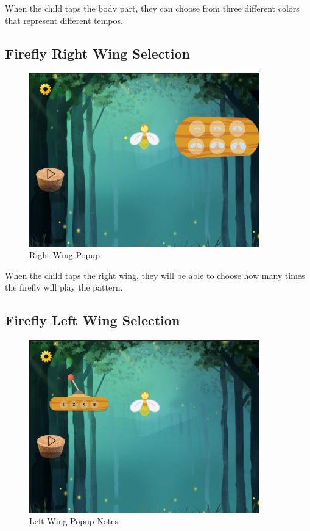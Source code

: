 When the child taps the body part, they can choose from three different colors that represent different tempos.

\subsection{Firefly Right Wing Selection}

\begin{figure}[H]
    \centering
    \includegraphics[width=10cm]{figures/newScreenFlows/newrightwing.png}
    \caption{Right Wing Popup}
    \label{fig:newrightwing}
\end{figure}

When the child taps the right wing, they will be able to choose how many times the firefly will play the pattern.

\subsection{Firefly Left Wing Selection}

\begin{figure}[H]
    \centering
    \includegraphics[width=10cm]{figures/newScreenFlows/newleftwing2.png}
    \caption{Left Wing Popup Notes}
    \label{fig:newleftwing}
\end{figure}

